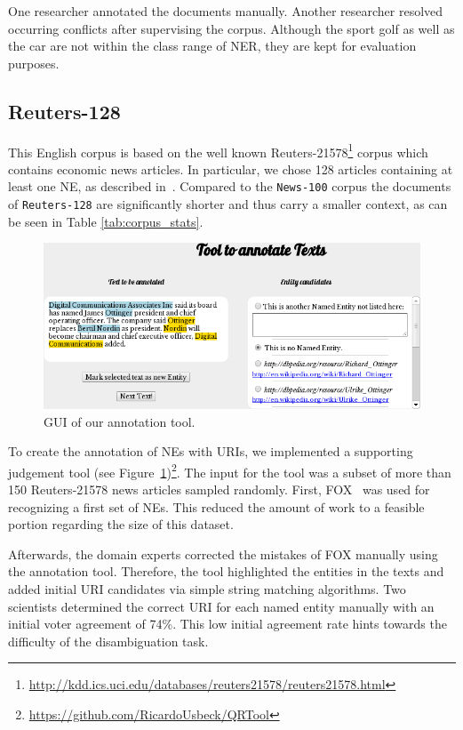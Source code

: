One researcher annotated the documents manually.
Another researcher resolved occurring conflicts after supervising the corpus.
Although the sport golf as well as the car are not within the class range of NER, they are kept for evaluation purposes.

\subsection{Reuters-128}

This English corpus is based on the well known Reuters-21578\footnote{\url{http://kdd.ics.uci.edu/databases/reuters21578/reuters21578.html}} corpus which contains economic news articles.
In particular, we chose 128 articles containing at least one NE, as described in~\cite{Usbeck2013}.
Compared to the \texttt{News-100} corpus the documents of \texttt{Reuters-128} are significantly shorter and thus carry a smaller context, as can be seen in Table \ref{tab:corpus_stats}.
\begin{figure}[tb]
\centering
\includegraphics[width=\linewidth]{chapter_three/benchmarking/LREC_N3NIFNERNED/qrtool.png}
\caption{GUI of our annotation tool.}
\label{fig:qrtool}
\end{figure}

To create the annotation of NEs with URIs, we implemented a supporting judgement tool (see Figure~\ref{fig:qrtool})\footnote{\url{https://github.com/RicardoUsbeck/QRTool}}. The input for the tool was a subset of more than 150 Reuters-21578 news articles sampled randomly.
First, FOX~\cite{FOX} was used for recognizing a first set of NEs. 
This reduced the amount of work to a feasible portion regarding the size of this dataset.

Afterwards, the domain experts corrected the  mistakes of FOX manually using the annotation tool.
Therefore, the tool highlighted the entities in the texts and added initial URI candidates via simple string matching algorithms.
Two scientists determined the correct URI for each named entity manually with an initial voter agreement of 74\%.
This low initial agreement rate hints towards the difficulty of the disambiguation task.

